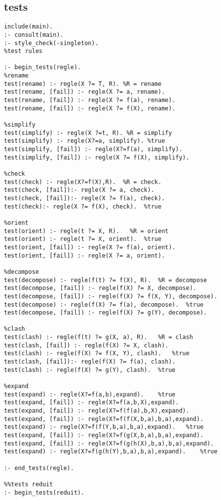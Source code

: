 \documentclass[10pt,a4paper]{report}
\begin{document}
\subsection{tests}
\begin{lstlisting}[caption ={le fichier test.pl}]
include(main).
:- consult(main).
:- style_check(-singleton).
%test rules

:- begin_tests(regle).
%rename
test(rename) :- regle(X ?= T, R). %R = rename
test(rename, [fail]) :- regle(X ?= a, rename).
test(rename, [fail]) :- regle(X ?= f(a), rename).
test(rename, [fail]) :- regle(X ?= f(X), rename).

%simplify
test(simplify) :- regle(X ?=t, R). %R = simplify
test(simplify) :- regle(X?=a, simplify). %true
test(simplify, [fail]) :- regle(X?=f(a), simplify).
test(simplify, [fail]) :- regle(X ?= f(X), simplify).

%check
test(check) :- regle(X?=f(X),R).  %R = check.
test(check, [fail]):- regle(X ?= a, check).
test(check, [fail]):- regle(X ?= f(a), check).
test(check):- regle(X ?= f(X), check).  %true

%orient
test(orient) :- regle(t ?= X, R).   %R = orient
test(orient) :- regle(t ?= X, orient).  %true
test(orient, [fail]) :- regle(X ?= f(a), orient).
test(orient, [fail]) :- regle(X ?= a, orient).

%decompose
test(decompose) :- regle(f(t) ?= f(X), R).  %R = decompose
test(decompose, [fail]) :- regle(f(X) ?= X, decompose).
test(decompose, [fail]) :- regle(f(X) ?= f(X, Y), decompose).
test(decompose) :- regle(f(X) ?= f(a), decompose).  %true
test(decompose, [fail]) :- regle(f(X) ?= g(Y), decompose).

%clash
test(clash) :- regle(f(t) ?= g(X, a), R).   %R = clash
test(clash, [fail]) :- regle(f(X) ?= X, clash).
test(clash) :- regle(f(X) ?= f(X, Y), clash).   %true
test(clash, [fail]):- regle(f(X) ?= f(a), clash).
test(clash) :- regle(f(X) ?= g(Y), clash).  %true

%expand
test(expand) :- regle(X?=f(a,b),expand).    %true
test(expand, [fail]) :- regle(X?=f(a,b,X),expand).
test(expand, [fail]) :- regle(X?=f(f(a),b,X),expand).
test(expand, [fail]) :- regle(X?=f(f(X,b,a),b,a),expand).
test(expand) :- regle(X?=f(f(Y,b,a),b,a),expand).   %true
test(expand, [fail]) :- regle(X?=f(g(X,b,a),b,a),expand).
test(expand, [fail]) :- regle(X?=f(g(h(X),b,a),b,a),expand).
test(expand) :- regle(X?=f(g(h(Y),b,a),b,a),expand).    %true

:- end_tests(regle).

%%tests reduit
:- begin_tests(reduit).


\end{lstlisting}
\end{document}
